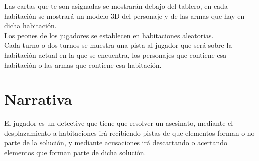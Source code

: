 Las cartas que te son asignadas se mostrarán debajo del tablero, en cada habitación se mostrará un modelo 3D del personaje y de las armas que hay en dicha habitación.\\

Los peones de los jugadores se establecen en habitaciones aleatorias.\\

Cada turno o dos turnos se muestra una pista al jugador que será sobre la habitación actual en la que se encuentra, los personajes que contiene esa habitación o las armas que contiene esa habitación.\\

\section{Narrativa}
El jugador es un detective que tiene que resolver un asesinato, mediante el desplazamiento a habitaciones irá recibiendo pistas de que elementos forman o no parte de la solución, y mediante acusaciones irá descartando o acertando elementos que forman parte de dicha solución.

